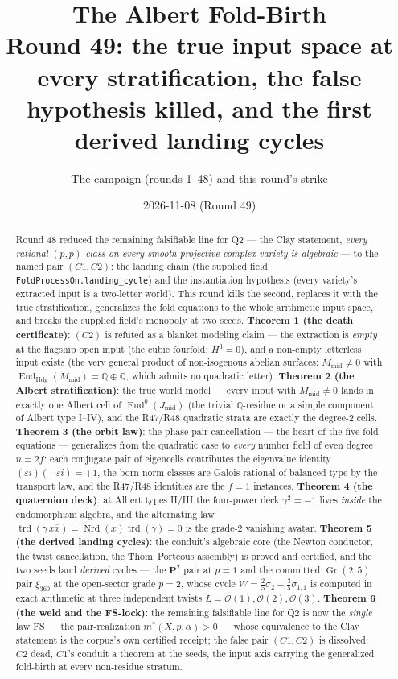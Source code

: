 \documentclass[11pt]{article}
\title{The Albert Fold-Birth\\
\large Round 49: the true input space at every stratification,
the false hypothesis killed, and the first derived landing cycles}
\author{The campaign (rounds 1--48) and this round's strike}
\date{2026-11-08 (Round 49)}
\newcommand{\Oo}{\mathcal O}
\newcommand{\Q}{\mathbb Q}
\newcommand{\End}{\operatorname{End}}
\newcommand{\Hdg}{\operatorname{Hdg}}
\newcommand{\trd}{\operatorname{trd}}
\newcommand{\Nrd}{\operatorname{Nrd}}
\newcommand{\Gr}{\operatorname{Gr}}
\begin{document}
\maketitle

\begin{abstract}
Round 48 reduced the remaining falsifiable line for Q2 --- the Clay
statement, \emph{every rational $(p,p)$ class on every smooth
projective complex variety is algebraic} --- to the named pair
$(C1,C2)$: the landing chain (the supplied field
\texttt{FoldProcessOn.landing\_cycle}) and the instantiation
hypothesis (every variety's extracted input is a two-letter world).
This round kills the second, replaces it with the true stratification,
generalizes the fold equations to the whole arithmetic input space, and
breaks the supplied field's monopoly at two seeds.
\textbf{Theorem 1 (the death certificate)}: $(C2)$ is refuted as a
blanket modeling claim --- the extraction is \emph{empty} at the
flagship open input (the cubic fourfold: $H^3=0$), and a non-empty
letterless input exists (the very general product of non-isogenous
abelian surfaces: $M_{\mathrm{mid}}\neq 0$ with
$\End_{\Hdg}(M_{\mathrm{mid}})=\Q\oplus\Q$, which admits no quadratic
letter). \textbf{Theorem 2 (the Albert stratification)}: the true world
model --- every input with $M_{\mathrm{mid}}\neq 0$ lands in exactly
one Albert cell of $\End^0(J_{\mathrm{mid}})$ (the trivial $\Q$-residue
or a simple component of Albert type I--IV), and the R47/R48 quadratic
strata are exactly the degree-$2$ cells.
\textbf{Theorem 3 (the orbit law)}: the phase-pair cancellation --- the
heart of the five fold equations --- generalizes from the quadratic
case to \emph{every} number field of even degree $n=2f$: each
conjugate pair of eigencells contributes the eigenvalue identity
$(\varepsilon i)(-\varepsilon i)=+1$, the born norm classes are
Galois-rational of balanced type by the transport law, and the R47/R48
identities are the $f=1$ instances. \textbf{Theorem 4 (the quaternion
deck)}: at Albert types II/III the four-power deck
$\gamma^2=-1$ lives \emph{inside} the endomorphism algebra, and the
alternating law $\trd(\gamma\,x\bar x)=\Nrd(x)\trd(\gamma)=0$ is the
grade-$2$ vanishing avatar. \textbf{Theorem 5 (the derived landing
cycles)}: the conduit's algebraic core (the Newton conductor, the twist
cancellation, the Thom--Porteous assembly) is proved and certified, and
the two seeds land \emph{derived} cycles --- the $\mathbf P^2$ pair at
$p=1$ and the committed $\Gr(2,5)$ pair $\xi_{360}$ at the
open-sector grade $p=2$, whose cycle
$W=\tfrac25\sigma_2-\tfrac35\sigma_{1,1}$ is computed in exact
arithmetic at three independent twists $L=\Oo(1),\Oo(2),\Oo(3)$. \textbf{Theorem 6 (the weld and
the FS-lock)}: the remaining falsifiable line for Q2 is now the
\emph{single} law FS --- the pair-realization
$m^*(X,p,\alpha)>0$ --- whose equivalence to the Clay statement is the
corpus's own certified receipt; the false pair $(C1,C2)$ is dissolved:
$C2$ dead, $C1$'s conduit a theorem at the seeds, the input axis
carrying the generalized fold-birth at every non-residue stratum.
\end{abstract}
\end{document}
